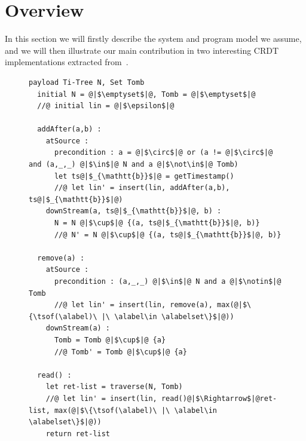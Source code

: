 \section{Overview}
\label{sec:overview}


In this section we will firstly describe the system and program model
we assume, and we will then illustrate our main contribution in two
interesting CRDT implementations extracted from~\cite{ShapiroPBZ11}.

\begin{figure}[t]
\begin{lstlisting}[caption={Replicated Growing Array (RGA) CRDT pseudo-code (adapted from~\cite{ShapiroPBZ11})},captionpos=b,label={lst:rga}]
  payload Ti-Tree N, Set Tomb
  initial N = @|$\emptyset$|@, Tomb = @|$\emptyset$|@
  //@ initial lin = @|$\epsilon$|@

  addAfter(a,b) :
    atSource :
      precondition : a = @|$\circ$|@ or (a != @|$\circ$|@ and (a,_,_) @|$\in$|@ N and a @|$\not\in$|@ Tomb)
      let ts@|$_{\mathtt{b}}$|@ = getTimestamp()
      //@ let lin' = insert(lin, addAfter(a,b), ts@|$_{\mathtt{b}}$|@)
    downStream(a, ts@|$_{\mathtt{b}}$|@, b) :
      N = N @|$\cup$|@ {(a, ts@|$_{\mathtt{b}}$|@, b)}
      //@ N' = N @|$\cup$|@ {(a, ts@|$_{\mathtt{b}}$|@, b)}

  remove(a) :
    atSource :
      precondition : (a,_,_) @|$\in$|@ N and a @|$\notin$|@ Tomb
      //@ let lin' = insert(lin, remove(a), max(@|$\{\tsof(\alabel)\ |\ \alabel\in \alabelset\}$|@))
    downStream(a) :
      Tomb = Tomb @|$\cup$|@ {a}
      //@ Tomb' = Tomb @|$\cup$|@ {a}

  read() :
    let ret-list = traverse(N, Tomb)
    //@ let lin' = insert(lin, read()@|$\Rightarrow$|@ret-list, max(@|$\{\tsof(\alabel)\ |\ \alabel\in \alabelset\}$|@))
    return ret-list
\end{lstlisting}
\end{figure}

